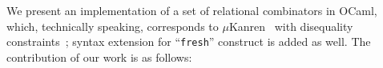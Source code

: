 \documentclass[10pt, oneside, nocopyrightspace]{sigplanconf}
\begin{document}
\begin{comment}
There are a few ways to overcome this problem. The first one is simply to follow the untyped paradigm and
provide unification for some concrete type, rich enough to represent any reasonable data structures.
Some Haskell miniKanren libraries\footnote{\url{https://github.com/JaimieMurdock/HK}, \url{https://github.com/rntz/ukanren}}
as well as existing OCaml implementation\footnote{\url{https://github.com/lightyang/minikanren-ocaml}} take this way. 
As a result, the original implementation can be retold with all its elegance; relational specifications, however,
become weakly typed. Another approach is to utilize \emph{ad hoc} polymorphism and provide type-specific
unification for each ``interesting'' type; Molog\footnote{\url{https://github.com/acfoltzer/Molog}} and 
MiniKanrenT\footnote{\url{https://github.com/jvranish/MiniKanrenT}}, both for Haskell, can be mentioned as examples.
While preserving strong typing, this approach requires a lot of ``boilerplate'' code to be written, so some
automation, for example, using Template Haskell\footnote{\url{https://wiki.haskell.org/Template_Haskell}},
is desirable. There is, actually, another potential approach, but we do not know, if anybody tried
it: to implement unification for generic representation of types as sum-of-products and fixpoints of 
functors~\cite{InstantGenerics, ALaCarte}. Thus, unification would work for any types, for which representation
is provided. We assume, that implementing representation would require less boilerplate code.

As it follows from given exposition, typed embedding of miniKanren in OCaml can be done with
a combination of datatype-generic programming~\cite{DGP} and \emph{ad hoc} polymorphism. There are a 
number of generic frameworks for OCaml (for example,~\cite{Deriving}). On the other hand, the support
for \emph{ad hoc} polymorphism in OCaml is weak; there is nothing comparable in power with Haskell 
type classes, and despite sometimes object-oriented layer of the language can be used to mimic
desirable behavior, the result as a rule is far from satisfactory. Existing proposals (for example, 
module implicits~\cite{Implicits}) require patching the compiler, which we tend to avoid.
\end{comment}

We present an implementation of a set of relational combinators in OCaml, which, 
technically speaking, corresponds to $\mu$Kanren~\cite{MicroKanren} with disequality 
constraints~\cite{CKanren}; syntax extension for ``\lstinline{fresh}'' construct is
added as well. The contribution of our work is as follows:
\end{document}
